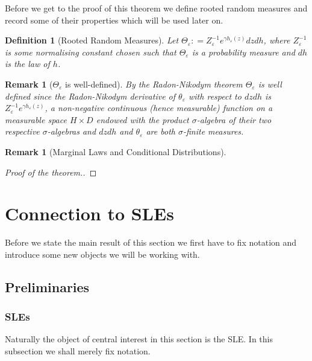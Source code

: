 \documentclass[11pt,reqno]{amsart}
\numberwithin{equation}{section}
\newtheorem{defi}[thm]{Definition}
\newtheorem{rem}[thm]{Remark}
\newcommand{\deq}{\mathrel{\mathop:}=}
\newcommand{\eps}{\varepsilon}
\begin{document}
Before we get to the proof of this theorem we define rooted random measures and record some of their properties which will be used later on.

\begin{defi}[Rooted Random Measures]
	Let $\Theta_\eps\deq Z^{-1}_\eps e^{\gamma h_\eps(z)}dzdh$, where $Z^{-1}_\eps$ is some normalising constant chosen such that $\Theta_\eps$ is a probability measure and $dh$ is the law of $h$.
\end{defi}
\begin{rem}[$\Theta_\eps$ is well-defined]
	By the Radon-Nikodym theorem $\Theta_\eps$ is well defined since the Radon-Nikodym derivative of $\theta_\eps$ with respect to $dzdh$ is $Z^{-1}_\eps e^{\gamma h_\eps(z)}$, a non-negative continuous (hence measurable) function on a measurable space $H\times D$ endowed with the product $\sigma$-algebra of their two respective $\sigma$-algebras and $dzdh$ and $\theta_\eps$ are both $\sigma$-finite measures.
\end{rem}

\begin{rem}[Marginal Laws and Conditional Distributions]
\end{rem}

\begin{proof}[Proof of the theorem.]
	
\end{proof}

\section{Connection to SLEs}
Before we state the main result of this section we first have to fix notation and introduce some new objects we will be working with.
\subsection{Preliminaries}

\subsubsection{SLEs}
Naturally the object of central interest in this section is the SLE. In this subsection we shall merely fix notation.
\end{document}
